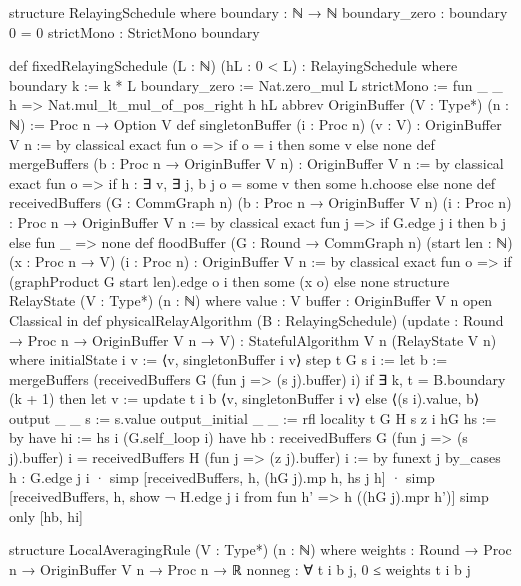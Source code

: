 \begin{leanlisting}
\begin{leancode}
structure RelayingSchedule where
  boundary : ℕ → ℕ
  boundary_zero : boundary 0 = 0
  strictMono : StrictMono boundary
\end{leancode}
\begin{leancode}
def fixedRelayingSchedule (L : ℕ) (hL : 0 < L) : RelayingSchedule where
  boundary k := k * L
  boundary_zero := Nat.zero_mul L
  strictMono := fun _ _ h => Nat.mul_lt_mul_of_pos_right h hL
abbrev OriginBuffer (V : Type*) (n : ℕ) := Proc n → Option V
def singletonBuffer (i : Proc n) (v : V) : OriginBuffer V n := by
  classical
  exact fun o => if o = i then some v else none
def mergeBuffers (b : Proc n → OriginBuffer V n) : OriginBuffer V n := by
  classical
  exact fun o => if h : ∃ v, ∃ j, b j o = some v then some h.choose else none
def receivedBuffers (G : CommGraph n) (b : Proc n → OriginBuffer V n)
    (i : Proc n) : Proc n → OriginBuffer V n := by
  classical
  exact fun j => if G.edge j i then b j else fun _ => none
def floodBuffer (G : Round → CommGraph n) (start len : ℕ)
    (x : Proc n → V) (i : Proc n) : OriginBuffer V n := by
  classical
  exact fun o => if (graphProduct G start len).edge o i then some (x o) else none
structure RelayState (V : Type*) (n : ℕ) where
  value : V
  buffer : OriginBuffer V n
open Classical in
def physicalRelayAlgorithm (B : RelayingSchedule)
    (update : Round → Proc n → OriginBuffer V n → V) :
    StatefulAlgorithm V n (RelayState V n) where
  initialState i v := ⟨v, singletonBuffer i v⟩
  step t G s i :=
    let b := mergeBuffers (receivedBuffers G (fun j => (s j).buffer) i)
    if ∃ k, t = B.boundary (k + 1) then
      let v := update t i b
      ⟨v, singletonBuffer i v⟩
    else ⟨(s i).value, b⟩
  output _ _ s := s.value
  output_initial _ _ := rfl
  locality t G H s z i hG hs := by
    have hi := hs i (G.self_loop i)
    have hb : receivedBuffers G (fun j => (s j).buffer) i =
        receivedBuffers H (fun j => (z j).buffer) i := by
      funext j
      by_cases h : G.edge j i
      · simp [receivedBuffers, h, (hG j).mp h, hs j h]
      · simp [receivedBuffers, h, show ¬ H.edge j i from fun h' => h ((hG j).mpr h')]
    simp only [hb, hi]
\end{leancode}
\begin{leancode}
structure LocalAveragingRule (V : Type*) (n : ℕ) where
  weights : Round → Proc n → OriginBuffer V n → Proc n → ℝ
  nonneg : ∀ t i b j, 0 ≤ weights t i b j

\end{leancode}
\end{leanlisting}
